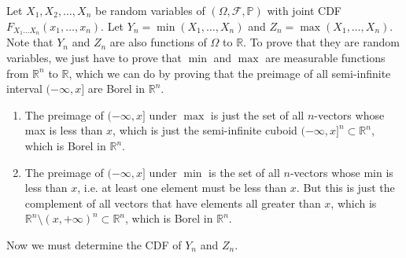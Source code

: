     Let $X_1, X_2, \ldots, X_n$ be random variables of $(\Omega, \mathcal{F}, \mathbb{P})$ with joint CDF $F_{X_1 \ldots X_n} (x_1, \ldots, x_n)$. Let $Y_n = \min (X_1, \ldots, X_n)$ and $Z_n = \max(X_1, \ldots, X_n)$. Note that $Y_n$ and $Z_n$ are also functions of $\Omega$ to $\mathbb{R}$. To prove that they are random variables, we just have to prove that $\min$ and $\max$ are measurable functions from $\mathbb{R}^n$ to $\mathbb{R}$, which we can do by proving that the preimage of all semi-infinite interval $(-\infty, x]$ are Borel in $\mathbb{R}^n$. 
    \begin{enumerate}
      \item The preimage of $(-\infty, x]$ under $\max$ is just the set of all $n$-vectors whose max is less than $x$, which is just the semi-infinite cuboid $(-\infty, x]^n \subset \mathbb{R}^n$, which is Borel in $\mathbb{R}^n$. 
      \item The preimage of $(-\infty, x]$ under $\min$ is the set of all $n$-vectors whose min is less than $x$, i.e. at least one element must be less than $x$. But this is just the complement of all vectors that have elements all greater than $x$, which is $\mathbb{R}^n \setminus (x, +\infty)^n \subset \mathbb{R}^n$, which is Borel in $\mathbb{R}^n$. 
    \end{enumerate}
    Now we must determine the CDF of $Y_n$ and $Z_n$. 
